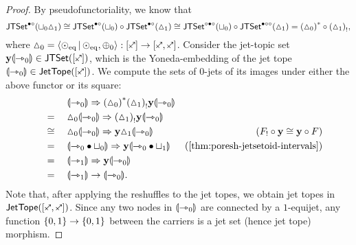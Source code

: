 \documentclass[a4paper]{memoir}
\begin{document}
\begin{proof}
	By pseudofunctoriality, we know that
	\[
		\mathsf{JTSet}^{\bullet \circ}({\sqcup}_0 {\vartriangle}_1)
		\cong \mathsf{JTSet}^{\bullet \circ}({\sqcup}_0) \circ \mathsf{JTSet}^{\bullet \circ}({\vartriangle}_1)
		\cong \mathsf{JTSet}^{\circ \bullet \circ}({\sqcup}_0) \circ \mathsf{JTSet}^{\bullet \circ \circ}({\vartriangle}_1)
		= {({\vartriangle}_0)}^* \circ {({\vartriangle}_1)}_!,
	\]
	where $\cohdisc_0 = \reshlist{\nonpol_\eqtydeg}{\nonpol_\eqtydeg, \pospol_0} : [\ypolar] \to [\ypolar, \ypolar]$.
	Consider the jet-topic set $\yoneda \rival{\jetsym_0} \in \jtset{[\ypolar]}$, which is the Yoneda-embedding of the jet tope $\rival{\jetsym_0} \in \jettope{[\ypolar]}$.
	We compute the sets of 0-jets of its images under either the above functor or its square:
	\begin{align*}
		&\quad\mathrel{\phantom{=}}\quad
		\DSub{\rival{\jetsym_0}}{\fpsh{(\cohdisc_0)} \lpsh{(\cohdisc_1)} \yoneda \rival{\jetsym_0}} \\
		&\quad=\quad \DSub{\cohdisc_0 \rival{\jetsym_0}}{\lpsh{(\cohdisc_1)} \yoneda \rival{\jetsym_0}} \\
		&\quad\cong\quad \DSub{\cohdisc_0 \rival{\jetsym_0}}{\yoneda \cohdisc_1 \rival{\jetsym_0}}
		& \text{($\lpsh F \circ \yoneda \cong \yoneda \circ F$)} \\
		&\quad=\quad \DSub{\rival{\jetsym_0 \oriof \cohfget_0}}{\yoneda \rival{\jetsym_0 \oriof \cohfget_1}}
		& \text{(\cref{thm:poresh-jetsetoid-intervals})} \\
		&\quad=\quad \DSub{\rival{\jetsym_1}}{\yoneda \rival{\jetsym_0}} \\
		&\quad=\quad \rival{\jetsym_1} \to \rival{\jetsym_0}.
	\end{align*}
	Note that, after applying the reshuffles to the jet topes, we obtain jet topes in $\jettope{[\ypolar, \ypolar]}$.
	Since any two nodes in ${\llparenthesis {\rightarrowtriangle}_0 \rrparenthesis}$ are connected by a $1$-equijet, any function $\mathopen{}\left\{ 0, 1 \right\}\mathclose{} \to \mathopen{}\left\{ 0, 1 \right\}\mathclose{}$ between the carriers is a jet set (hence jet tope) morphism.
	

\end{proof}
\end{document}
